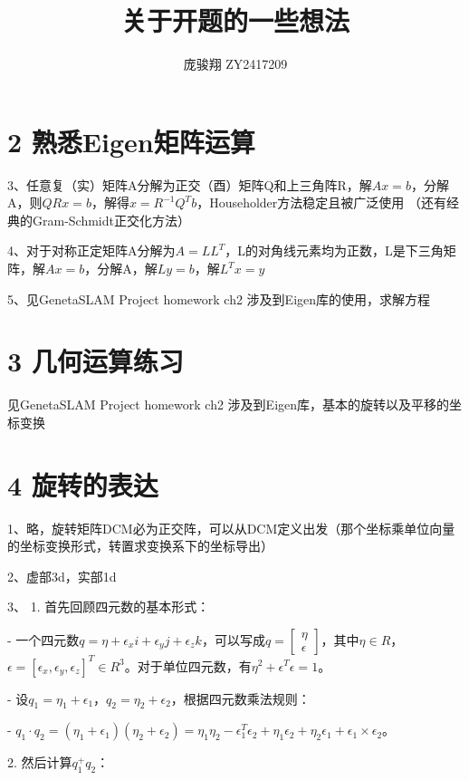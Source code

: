 \documentclass[12pt, a4paper, oneside]{ctexart}
\title{\vspace{-4cm}\bfseries{关于开题的一些想法}}
\author{\large 庞骏翔 \quad ZY2417209}  %
\date{}
\begin{document}
	
	\pagestyle{plain}
	\maketitle
	\section{2 熟悉Eigen矩阵运算}
	
	3、任意复（实）矩阵A分解为正交（酉）矩阵Q和上三角阵R，解$Ax=b$，分解A，则$QRx=b$，解得$x=R^{-1}Q^{T}b$，Householder方法稳定且被广泛使用
	（还有经典的Gram-Schmidt正交化方法）
	
	4、对于对称正定矩阵A分解为$A=LL^{T}$，L的对角线元素均为正数，L是下三角矩阵，解$Ax=b$，分解A，解$Ly=b$，解$L^{T}x=y$
	
	5、见GenetaSLAM Project homework ch2 涉及到Eigen库的使用，求解方程
	
	\section{3 几何运算练习}
	
	见GenetaSLAM Project homework ch2 涉及到Eigen库，基本的旋转以及平移的坐标变换
	
	\section{4 旋转的表达}
	
	1、略，旋转矩阵DCM必为正交阵，可以从DCM定义出发（那个坐标乘单位向量的坐标变换形式，转置求变换系下的坐标导出）
	
	2、虚部3d，实部1d
	
	3、
	1. 首先回顾四元数的基本形式：

	- 一个四元数\(q = \eta+\epsilon_x i+\epsilon_y j+\epsilon_z k\)，可以写成\(q=\left[\begin{array}{c}\eta\\\epsilon\end{array}\right]\)，其中\(\eta\in R\)，\(\epsilon = [\epsilon_x,\epsilon_y,\epsilon_z]^T\in R^3\)。对于单位四元数，有\(\eta^{2}+\epsilon^{T}\epsilon = 1\)。
	
	- 设\(q_1=\eta_1+\epsilon_1\)，\(q_2=\eta_2+\epsilon_2\)，根据四元数乘法规则：

	- \(q_1\cdot q_2=(\eta_1+\epsilon_1)(\eta_2+\epsilon_2)=\eta_1\eta_2-\epsilon_1^{T}\epsilon_2+\eta_1\epsilon_2+\eta_2\epsilon_1+\epsilon_1\times\epsilon_2\)。

	2. 然后计算\(q_1^{+}q_2\)：
\end{document}

